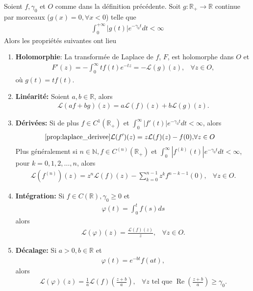 \begin{myTheorem}
	Soient $f, \gamma_0$ et $O$ comme dans la définition précédente. Soit $g:\mathbb R_+\rightarrow\mathbb R$ continue par morceaux ($g(x)=0,\forall x<0$) telle que
	\begin{eqnarray*}
		\int_{0}^{+\infty}|g(t)|e^{-\gamma_0t}dt<\infty
	\end{eqnarray*}
	Alors les propriétés suivantes ont lieu
	\begin{enumerate}
		\item \textbf{Holomorphie}: La transformée de Laplace de $f$, $F$, est holomorphe dans $O$ et
		\begin{eqnarray}
			F'(z)=-\int_0^{\infty}tf(t)e^{-tz}=-\mathcal L(g)(z),&\forall z\in O,
		\end{eqnarray}
		où $g(t)=tf(t)$.
		\item \textbf{Linéarité:} Soient $a,b\in\mathbb R$, alors
		\begin{eqnarray}
			\mathcal L(af+bg)(z)=a\mathcal L(f)(z)+b\mathcal L(g)(z).
		\end{eqnarray}
		\item \textbf{Dérivées:} Si de plus $f\in C^1(\mathbb R_+)$ et $\int_0^{\infty}|f'(t)|e^{-\gamma_0t}dt<\infty$, alors
		\begin{eqnarray}
			\ref{prop:laplace_derivee}
			\mathcal L(f')(z)=z\mathcal L(f)(z)-f(0),&\forall z\in O
		\end{eqnarray} 
		Plus généralement si $n\in\mathbb N, f\in C^{(n)}(\mathbb R_+)$ et $\int_0^{\infty}|f^{(k)}(t)|e^{-\gamma_0t}dt<\infty$, pour $k=0,1,2,\dots,n$, alors	
		\begin{eqnarray}
			\mathcal L(f^{(n)})(z)=z^n\mathcal L(f)(z)-\sum_{k=0}^{n-1}z^kf^{n-k-1}(0), &\forall z\in O.
		\end{eqnarray}
		\item \textbf{Intégration:} Si $f\in C(\mathbb R), \gamma_0\geq0$ et
		\begin{eqnarray*}
			\varphi(t)=\int_0^tf(s)ds
		\end{eqnarray*}
		alors
		\begin{eqnarray}
			\mathcal L(\varphi)(z)=\frac{\mathcal L(f)(z)}{z},&\forall z\in O.
		\end{eqnarray}
		
		\item \textbf{Décalage:} Si $a>0,b\in\mathbb R$ et
		\begin{eqnarray*}
			\varphi(t)=e^{-bt}f(at),
		\end{eqnarray*}
		alors
		\begin{eqnarray}
			\mathcal L(\varphi)(z)=\frac{1}{a}\mathcal L(f)(\frac{z+b}{a}),&\forall z \text{ tel que }\mathop{Re}(\frac{z+b}{a})\geq\gamma_0.
		\end{eqnarray}
		

\end{enumerate}
\end{myTheorem}
